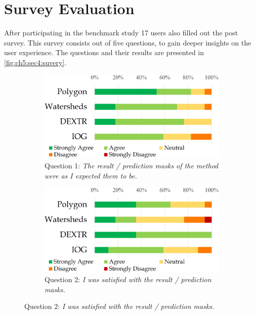 
\section{Survey Evaluation}\label{ord:ch5:sec4_survey}
After participating in the benchmark study 17 users also filled out the post survey.
This survey consists out of five questions, to gain deeper insights on the user experience.
The questions and their results are presented in \ref{fig:ch5:sec4:suvery}.

\begin{figure} [h!]
	\centering
	\begin{subfigure}[t]{0.48\textwidth}
		\centering
		\includegraphics[width=\textwidth]{figures/chap54_q1.png}
		\caption{
			Question 1: \textit{The result / prediction masks of the method were as I expected them to be.}
		} \label{fig:ch5:sec4:q1}
	\end{subfigure}
	\hfill
	\begin{subfigure}[t]{0.48\textwidth}
		\centering
		\includegraphics[width=\textwidth]{figures/chap54_q2.png}
		\caption{
			Question 2: \textit{I was satisfied with the result / prediction masks.}
}
\end{subfigure}
\end{figure}
